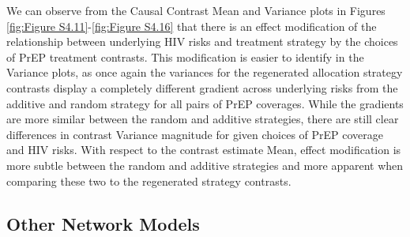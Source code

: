 \documentclass{article}
\theoremstyle{definition}
\begin{document}
We can observe from the Causal Contrast Mean and Variance plots in Figures \ref{fig:Figure S4.11}-\ref{fig:Figure S4.16} that there is an effect modification of the relationship between underlying HIV risks and treatment strategy by the choices of PrEP treatment contrasts. This modification is easier to identify in the Variance plots, as once again the variances for the regenerated allocation strategy contrasts display a completely different gradient across underlying risks from the additive and random strategy for all pairs of PrEP coverages. While the gradients are more similar between the random and additive strategies, there are still clear differences in contrast Variance magnitude for given choices of PrEP coverage and HIV risks. With respect to the contrast estimate Mean, effect modification is more subtle between the random and additive strategies and more apparent when comparing these two to the regenerated strategy contrasts. 
\subsection{Other Network Models}
\end{document}

